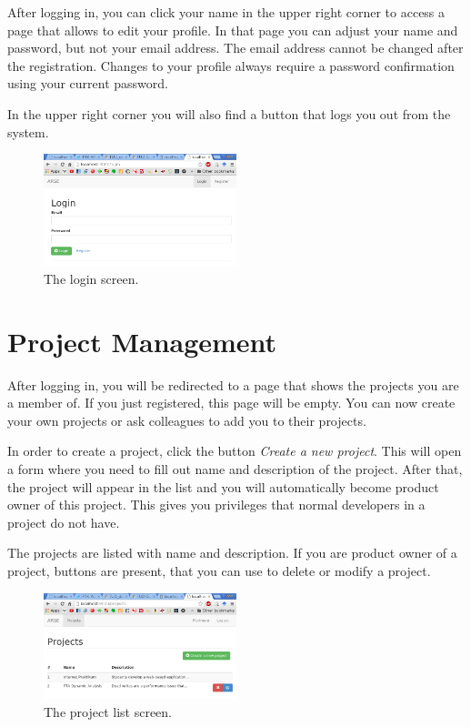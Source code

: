 \documentclass[
	accentcolor=tud1a %
]{tudreport}
\begin{document}
After logging in, you can click your name in the upper right corner to access a page that allows to edit your profile. In that page you can adjust your name and password, but not your email address. The email address cannot be changed after the registration. Changes to your profile always require a password confirmation using your current password.

In the upper right corner you will also find a button that logs you out from the system.

\begin{figure}[ht]
	\centering
	\includegraphics[width=0.5\textwidth]{img/login}
	\caption{The login screen.}
	\label{fig:login}
\end{figure}

\section{Project Management}
\label{sec:project-mgmt}

After logging in, you will be redirected to a page that shows the projects you are a member of. If you just registered, this page will be empty. You can now create your own projects or ask colleagues to add you to their projects.

In order to create a project, click the button \emph{Create a new project}. This will open a form where you need to fill out name and description of the project. After that, the project will appear in the list and you will automatically become product owner of this project. This gives you privileges that normal developers in a project do not have.

The projects are listed with name and description. If you are product owner of a project, buttons are present, that you can use to delete or modify a project.

\begin{figure}[ht]
	\centering
	\includegraphics[width=0.5\textwidth]{img/projects}
	\caption{The project list screen.}
	\label{fig:project-list}
\end{figure}
\end{document}
